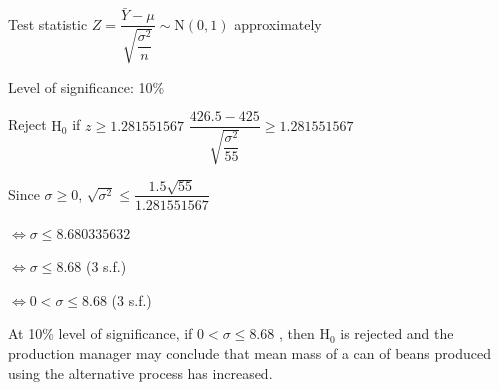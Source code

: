 {Test statistic $Z=\dfrac{\bar{Y}-\mu}{\sqrt{\dfrac{\sigma^2}{n}}}\sim\mathrm{N}(0,1)$ approximately\par\medskip
Level of significance: 10\%\par
Reject $\mathrm{H}_0$ if $z\geq1.281551567$
$\dfrac{426.5-425}{\sqrt{\dfrac{\sigma^2}{55}}}\geq1.281551567$\par
Since $\sigma\geq0$, $\sqrt{\sigma^2}\leq\dfrac{1.5\sqrt{55}}{1.281551567}$\par
\qquad $\Leftrightarrow\sigma\leq8.680335632$\par
\qquad $\Leftrightarrow\sigma\leq8.68$ (3 s.f.)\par
\qquad $\Leftrightarrow0<\sigma\leq8.68$ (3 s.f.)\par\medskip
At 10\% level of significance, if $0<\sigma\leq8.68$ , then $\mathrm{H}_0$ is rejected and the production manager may conclude that mean mass of a can of beans produced using the alternative process has increased.
}
